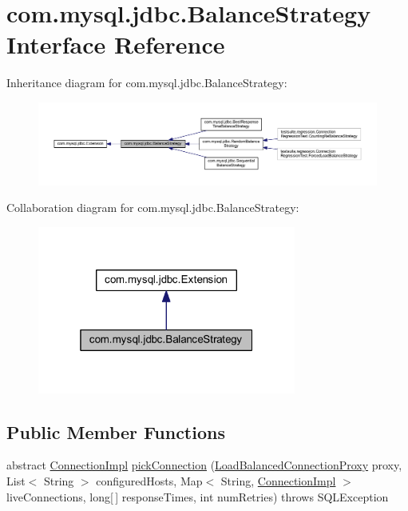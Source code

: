 \hypertarget{interfacecom_1_1mysql_1_1jdbc_1_1_balance_strategy}{}\section{com.\+mysql.\+jdbc.\+Balance\+Strategy Interface Reference}
\label{interfacecom_1_1mysql_1_1jdbc_1_1_balance_strategy}


Inheritance diagram for com.\+mysql.\+jdbc.\+Balance\+Strategy\+:\nopagebreak
\begin{figure}[H]
\begin{center}
\leavevmode
\includegraphics[width=350pt]{interfacecom_1_1mysql_1_1jdbc_1_1_balance_strategy__inherit__graph}
\end{center}
\end{figure}


Collaboration diagram for com.\+mysql.\+jdbc.\+Balance\+Strategy\+:\nopagebreak
\begin{figure}[H]
\begin{center}
\leavevmode
\includegraphics[width=241pt]{interfacecom_1_1mysql_1_1jdbc_1_1_balance_strategy__coll__graph}
\end{center}
\end{figure}
\subsection*{Public Member Functions}
\begin{DoxyCompactItemize}
\item 
abstract \mbox{\hyperlink{classcom_1_1mysql_1_1jdbc_1_1_connection_impl}{Connection\+Impl}} \mbox{\hyperlink{interfacecom_1_1mysql_1_1jdbc_1_1_balance_strategy_a9cebc8dcd86aaf1c7dcb458cc7755540}{pick\+Connection}} (\mbox{\hyperlink{classcom_1_1mysql_1_1jdbc_1_1_load_balanced_connection_proxy}{Load\+Balanced\+Connection\+Proxy}} proxy, List$<$ String $>$ configured\+Hosts, Map$<$ String, \mbox{\hyperlink{classcom_1_1mysql_1_1jdbc_1_1_connection_impl}{Connection\+Impl}} $>$ live\+Connections, long\mbox{[}$\,$\mbox{]} response\+Times, int num\+Retries)  throws S\+Q\+L\+Exception
\end{DoxyCompactItemize}


